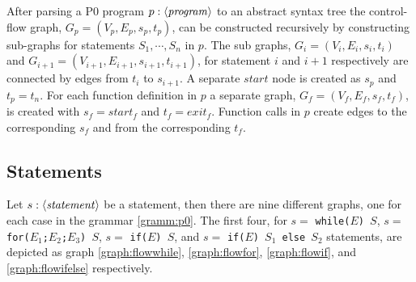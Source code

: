 After parsing a P0 program $p : \langle\mathit{\mathit{program}}\rangle$ to an abstract syntax tree the control-flow graph, $G_p = (V_p, E_p, s_p, t_p)$, can be constructed recursively by constructing sub-graphs for statements $S_1, \cdots, S_n$ in $p$. The sub graphs, $G_i = (V_i, E_i, s_i, t_i)$ and $G_{i+1} = (V_{i+1}, E_{i+1}, s_{i+1}, t_{i+1})$, for statement $i$ and $i+1$ respectively are connected by edges from $t_i$ to $s_{i+1}$. A separate $\mathit{start}$ node is created as $s_p$ and $t_p = t_n$. For each function definition in $p$ a separate graph, $G_f = (V_f, E_f, s_f, t_f)$, is created with $s_f = \mathit{start}_f$ and $t_f = \mathit{exit}_f$. Function calls in $p$ create edges to the corresponding $s_f$ and from the corresponding $t_f$.

\subsection{Statements}
Let $s : \langle\mathit{statement}\rangle$ be a statement, then there are nine different graphs, one for each case in the grammar \ref{gramm:p0}. The first four, for $s = $ \texttt{while($E$) $S$}, $s = $ \texttt{for($E_1$;$ E_2$;$E_3$) $S$}, $s = $ \texttt{if($E$) $S$}, and $s = $ \texttt{if($E$) $S_1$ else $S_2$} statements, are depicted as graph \ref{graph:flowwhile}, \ref{graph:flowfor}, \ref{graph:flowif}, and \ref{graph:flowifelse} respectively.


